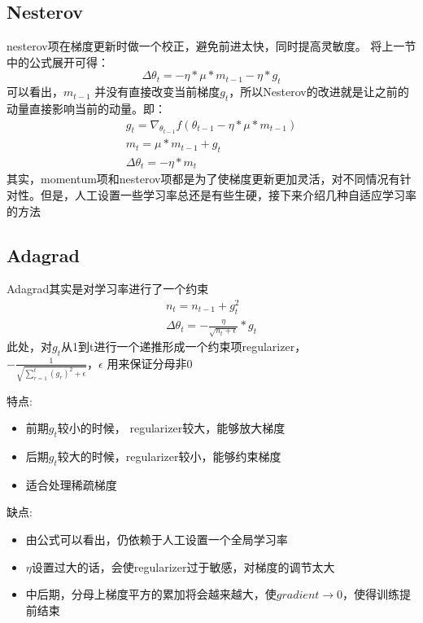 \documentclass[hyperref, UTF-8]{ctexart}
\begin{document}
\subsection{Nesterov}
nesterov项在梯度更新时做一个校正，避免前进太快，同时提高灵敏度。 将上一节中的公式展开可得：
\begin{displaymath}
\Delta{\theta_t}=-\eta*\mu*m_{t-1}-\eta*g_t
\end{displaymath}
可以看出，$m_{t-1}$
并没有直接改变当前梯度$g_t$，所以Nesterov的改进就是让之前的动量直接影响当前的动量。即：
\begin{eqnarray*}
g_t=\nabla_{\theta_{t-1}}{f(\theta_{t-1}-\eta*\mu*m_{t-1})}  \\
m_t=\mu*m_{t-1}+g_t  \\
\Delta{\theta_t}=-\eta*m_t 
\end{eqnarray*}
其实，momentum项和nesterov项都是为了使梯度更新更加灵活，对不同情况有针对性。但是，人工设置一些学习率总还是有些生硬，接下来介绍几种自适应学习率的方法

\subsection{Adagrad}
Adagrad其实是对学习率进行了一个约束
\begin{eqnarray*}
n_t=n_{t-1}+g_t^2 \\
\Delta{\theta_t}=-\frac{\eta}{\sqrt{n_t+\epsilon}}*g_t 
\end{eqnarray*}
此处，对$g_t$从1到t进行一个递推形成一个约束项regularizer， \\
$-\frac{1}{\sqrt{\sum_{r=1}^t(g_r)^2+\epsilon}}，\epsilon$ 用来保证分母非0 

特点:
\begin{itemize}
\item 前期$g_t$较小的时候， regularizer较大，能够放大梯度
\item 后期$g_t$较大的时候，regularizer较小，能够约束梯度
\item 适合处理稀疏梯度
\end{itemize}

缺点:
\begin{itemize}
\item 由公式可以看出，仍依赖于人工设置一个全局学习率
\item $\eta$设置过大的话，会使regularizer过于敏感，对梯度的调节太大
\item 中后期，分母上梯度平方的累加将会越来越大，使$gradient\to0$，使得训练提前结束
\end{itemize}
\end{document}
